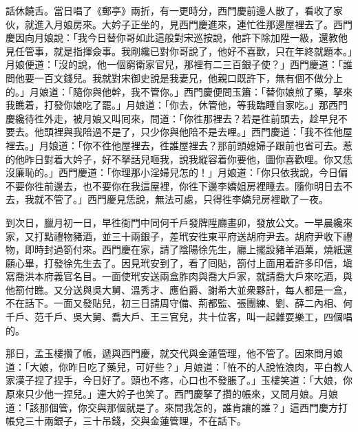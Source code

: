 話休饒舌。當日唱了《郵亭》兩折，有一更時分，西門慶前邊人散了，看收了家伙，就進入月娘房來。大妗子正坐的，見西門慶進來，連忙徃那邊屋裡去了。西門慶因向月娘說：「我今日替你哥如此這般對宋巡按說，他許下除加陞一級，還教他見任管事，就是指揮僉事。我剛纔已對你哥說了，他好不喜歡，只在年終就題本。」月娘便道：「沒的說，他一個窮衛家官兒，那裡有二三百銀子使？」西門慶道：「誰問他要一百文錢兒。我就對宋御史說是我妻兄，他親口既許下，無有個不做分上的。」月娘道：「隨你與他幹，我不管你。」西門慶便問玉簫：「替你娘煎了藥，拏來我瞧着，打發你娘吃了罷。」月娘道：「你去，休管他，等我臨睡自家吃。」那西門慶纔待徃外走，被月娘又叫囘來，問道：「你徃那裡去？若是徃前頭去，趁早兒不要去。他頭裡與我陪過不是了，只少你與他陪不是去哩。」{}西門慶道：「我不徃他屋裡去。」月娘道：「你不徃他屋裡去，徃誰屋裡去？那前頭媳婦子跟前也省可去。惹的他昨日對着大妗子，好不拏話兒咂我，說我縱容着你要他，圖你喜歡哩。你又恁沒廉恥的。」西門慶道：「你理那小淫婦兒怎的！」{}月娘道：「你只依我說，今日偏不要你徃前邊去，也不要你在我這屋裡，你徃下邊李嬌姐房裡睡去。隨你明日去不去，我就不管了。」西門慶見恁說，無法可處，只得徃李嬌兒房裡歇了一夜。

到次日，臘月初一日，早徃衙門中同何千戶發牌陞廳畫卯，發放公文。一早晨纔來家，又打點禮物豬酒，並三十兩銀子，差玳安徃東平府送胡府尹去。胡府尹收下禮物，即時封過箚付來。西門慶在家，請了陰陽徐先生，廳上擺設豬羊酒菓，燒紙還願心畢，打發徐先生去了。因見玳安到了，看了囘貼，箚付上面用着許多印信，塡寫喬洪本府義官名目。一面使玳安送兩盒胙肉與喬大戶家，就請喬大戶來吃酒，與他箚付瞧。又分送與吳大舅、溫秀才、應伯爵、謝希大並衆夥計，每人都是一盒，不在話下。一面又發貼兒，初三日請周守備、荊都監、張團練、劉、薛二內相、何千戶、范千戶、吳大舅、喬大戶、王三官兒，共十位客，叫一起雜耍樂工，四個唱的。

那日，孟玉樓攢了帳，遞與西門慶，就交代與金蓮管理，他不管了。因來問月娘道：「大娘，你昨日吃了藥兒，可好些？」月娘道：「恠不的人說恠浪肉，平白教人家漢子捏了捏手，今日好了。{}頭也不疼，心口也不發脹了。」玉樓笑道：「大娘，你原來只少他一捏兒。」連大妗子也笑了。西門慶拏了攢的帳來，又問月娘。月娘道：「該那個管，你交與那個就是了。來問我怎的，誰肯讓的誰？」{}這西門慶方打帳兌三十兩銀子，三十吊錢，交與金蓮管理，不在話下。

